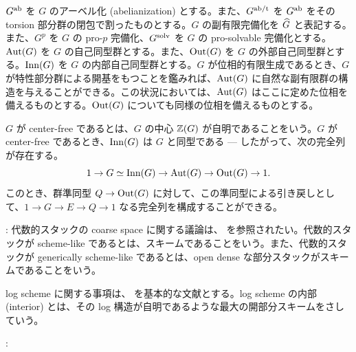 $G^{\mathrm{ab}}$ を $G$ のアーベル化 (abelianization) とする。また、$G^{\mathrm{ab}/\mathrm{t}}$ を $G^{\mathrm{ab}}$ をその torsion 部分群の閉包で割ったものとする。$G$ の副有限完備化を $\widehat{G}$ と表記する。また、$G^p$ を $G$ の pro-$p$ 完備化、$G^{\mathrm{solv}}$ を $G$ の pro-solvable 完備化とする。$\mathrm{Aut}(G)$ を $G$ の自己同型群とする。また、$\mathrm{Out}(G)$ を $G$ の外部自己同型群とする。$\mathrm{Inn}(G)$ を $G$ の内部自己同型群とする。$G$ が位相的有限生成であるとき、$G$ が特性部分群による開基をもつことを鑑みれば、$\mathrm{Aut}(G)$ に自然な副有限群の構造を与えることができる。この状況においては、$\mathrm{Aut}(G)$ はここに定めた位相を備えるものとする。$\mathrm{Out}(G)$ についても同様の位相を備えるものとする。

$G$ が center-free であるとは、$G$ の中心 $\mathbb{Z}(G)$ が自明であることをいう。$G$ が center-free であるとき、$\mathrm{Inn}(G)$ は $G$ と同型である --- したがって、次の完全列が存在する。
\[
1 \to G \simeq \mathrm{Inn}(G) \to \mathrm{Aut}(G) \to \mathrm{Out}(G) \to 1.
\]
このとき、群準同型 $Q \to \mathrm{Out}(G)$ に対して、この準同型による引き戻しとして、$1 \to G \to E \to Q \to 1$ なる完全列を構成することができる。

: 代数的スタックの coarse space に関する議論は、\cite[Chapter I, \S 4.10]{FC} を参照されたい。代数的スタックが scheme-like であるとは、スキームであることをいう。また、代数的スタックが generically scheme-like であるとは、open dense な部分スタックがスキームであることをいう。

log scheme に関する事項は、\cite{Kato} を基本的な文献とする。log scheme の内部 (interior) とは、その log 構造が自明であるような最大の開部分スキームをさしていう。

:
